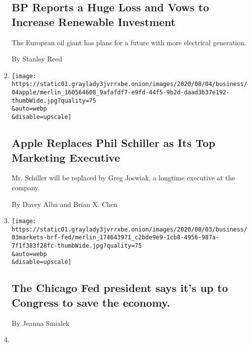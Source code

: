 \begin{enumerate}
{  \subsection{BP Reports a Huge Loss and Vows to Increase Renewable
  Investment}\label{bp-reports-a-huge-loss-and-vows-to-increase-renewable-investment}}

  The European oil giant has plans for a future with more electrical
  generation.

  By Stanley Reed
\item
  \href{/2020/08/04/technology/apple-schiller-marketing-executive-departure.html}{}

  \texttt{[image: https://static01.graylady3jvrrxbe.onion/images/2020/08/04/business/04apple/merlin\_160564608\_9afafdf7-e9fd-44f5-9b2d-daad3b37e192-thumbWide.jpg?quality=75\\\&auto=webp\\\&disable=upscale]}

  \hypertarget{apple-replaces-phil-schiller-as-its-top-marketing-executive}{%
  \subsection{Apple Replaces Phil Schiller as Its Top Marketing
  Executive}\label{apple-replaces-phil-schiller-as-its-top-marketing-executive}}

  Mr. Schiller will be replaced by Greg Joswiak, a longtime executive at
  the company.

  By Davey Alba and Brian X. Chen
\item
  \href{/2020/08/04/business/the-chicago-fed-president-says-its-up-to-congress-to-save-the-economy.html}{}

  \texttt{[image: https://static01.graylady3jvrrxbe.onion/images/2020/08/03/business/03markets-brf-fed/merlin\_174643971\_c2bde9e9-1cb8-4956-987a-7f1f383f28fc-thumbWide.jpg?quality=75\\\&auto=webp\\\&disable=upscale]}

  \hypertarget{the-chicago-fed-president-says-its-up-to-congress-to-save-the-economy}{%
  \subsection{The Chicago Fed president says it's up to Congress to save
  the
  economy.}\label{the-chicago-fed-president-says-its-up-to-congress-to-save-the-economy}}

  By Jeanna Smialek
\item
  \href{/2020/08/04/business/faa-says-boeing-has-effectively-mitigated-defects-in-the-737-max.html}{}


\end{enumerate}
